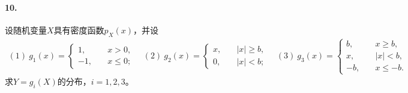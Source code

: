 \documentclass[12pt, a4paper, oneside]{ctexart}
\begin{document}
\paragraph{10.}设随机变量$X$具有密度函数$p_X(x)$，并设
\begin{equation*}
    \begin{aligned}
        (1)\ g_1(x) = \begin{cases}
            1,&\quad x > 0,\\
            -1,&\quad x \leqslant 0;
        \end{cases}\quad (2)\ g_2(x)=\begin{cases}
            x,&\quad |x|\geqslant b,\\
            0,&\quad |x| <b;
        \end{cases}\quad
        (3)\ g_3(x)=\begin{cases}
            b,&\quad x \geqslant b,\\
            x,&\quad |x| < b,\\
            -b,&\quad x\leqslant -b.
        \end{cases}
    \end{aligned}
\end{equation*}
求$Y=g_i(X)$的分布，$i=1,2,3$。
\end{document}
